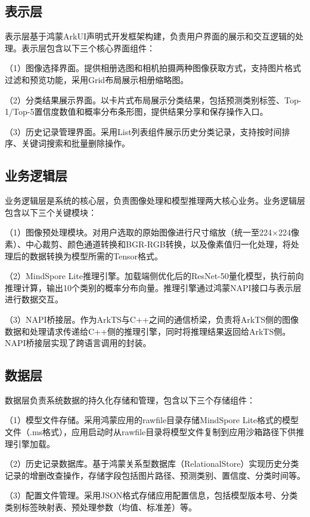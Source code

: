 \subsection{表示层}

表示层基于鸿蒙ArkUI声明式开发框架构建，负责用户界面的展示和交互逻辑的处理。表示层包含以下三个核心界面组件：

（1）图像选择界面。提供相册选图和相机拍摄两种图像获取方式，支持图片格式过滤和预览功能，采用Grid布局展示相册缩略图。

（2）分类结果展示界面。以卡片式布局展示分类结果，包括预测类别标签、Top-1/Top-5置信度数值和概率分布条形图，提供结果分享和保存操作入口。

（3）历史记录管理界面。采用List列表组件展示历史分类记录，支持按时间排序、关键词搜索和批量删除操作。

\subsection{业务逻辑层}

业务逻辑层是系统的核心层，负责图像处理和模型推理两大核心业务。业务逻辑层包含以下三个关键模块：

（1）图像预处理模块。对用户选取的原始图像进行尺寸缩放（统一至224$\times$224像素）、中心裁剪、颜色通道转换和BGR-RGB转换，以及像素值归一化处理，将处理后的数据转换为模型所需的Tensor格式。

（2）MindSpore Lite推理引擎。加载端侧优化后的ResNet-50量化模型，执行前向推理计算，输出10个类别的概率分布向量。推理引擎通过鸿蒙NAPI接口与表示层进行数据交互。

（3）NAPI桥接层。作为ArkTS与C++之间的通信桥梁，负责将ArkTS侧的图像数据和处理请求传递给C++侧的推理引擎，同时将推理结果返回给ArkTS侧。NAPI桥接层实现了跨语言调用的封装。

\subsection{数据层}

数据层负责系统数据的持久化存储和管理，包含以下三个存储组件：

（1）模型文件存储。采用鸿蒙应用的rawfile目录存储MindSpore Lite格式的模型文件（.ms格式），应用启动时从rawfile目录将模型文件复制到应用沙箱路径下供推理引擎加载。

（2）历史记录数据库。基于鸿蒙关系型数据库（RelationalStore）实现历史分类记录的增删改查操作，存储字段包括图片路径、预测类别、置信度、分类时间等。

（3）配置文件管理。采用JSON格式存储应用配置信息，包括模型版本号、分类类别标签映射表、预处理参数（均值、标准差）等。

